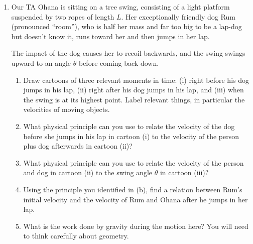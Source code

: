 \documentclass[12pt]{article}
\begin{document}
\Large
\centerline{}

\normalsize
\centerline{}

\bigskip
\bigskip
\begin{enumerate}

\item Our TA Ohana is sitting on a tree swing, consisting of a light platform suspended by two ropes of length $L$. Her exceptionally friendly dog Rum (pronounced ``room''), who is half her mass and far too big to be a lap-dog but doesn't know it, runs toward her 
and then jumps in her lap.

The impact of the dog causes her to recoil backwards, and the swing swings upward to an angle $\theta$ before coming back down.

\begin{enumerate}

\item Draw cartoons of three relevant moments in time: (i) right before his dog jumps in his lap, (ii) right after his dog jumps in his lap, and (iii) when the swing is at its highest point. Label relevant things, in particular the velocities
of moving objects.

\vspace{3.5in}

\item What physical principle can you use to relate the velocity of the dog before she jumps in his lap in cartoon (i) to the velocity of the person plus dog afterwards in cartoon (ii)?

\vspace{1in}

\item What physical principle can you use to relate the velocity of the person and dog in cartoon (ii) to the swing angle $\theta$ in cartoon (iii)?

\vspace{1in}
\newpage

\item Using the principle you identified in (b), find a relation between Rum's initial velocity and the velocity of Rum and Ohana after he jumps in her lap.

\vspace{2in}

\item What is the work done by gravity during the motion here? You will need to think carefully about geometry.


\end{enumerate}
\end{enumerate}
\end{document}
